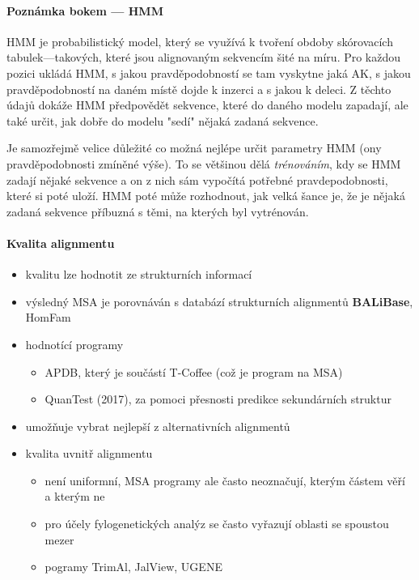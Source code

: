 \documentclass[DIV=8]{scrreprt}
\newcommand{\mybox}[2]{
    \paragraph{#1} #2
}
\begin{document}
\mybox{Poznámka bokem --- HMM}{HMM je probabilistický model, který se využívá k tvoření obdoby skórovacích tabulek---takových, které jsou alignovaným sekvencím šité na míru. Pro každou pozici ukládá HMM, s jakou pravděpodobností se tam vyskytne jaká AK, s jakou pravděpodobností na daném místě dojde k inzerci a s jakou k deleci. Z těchto údajů dokáže HMM předpovědět sekvence, které do daného modelu zapadají, ale také určit, jak dobře do modelu "sedí" nějaká zadaná sekvence.

Je samozřejmě velice důležité co možná nejlépe určit parametry HMM (ony pravděpodobnosti zmíněné výše). To se většinou dělá \emph{trénováním}, kdy se HMM zadají nějaké sekvence a on z nich sám vypočítá potřebné pravdepodobnosti, které si poté uloží. HMM poté může rozhodnout, jak velká šance je, že je nějaká zadaná sekvence příbuzná s těmi, na kterých byl vytrénován.}


\paragraph{Kvalita alignmentu}
\begin{itemize}[nosep]
    \item kvalitu lze hodnotit ze strukturních informací
    \item výsledný MSA je porovnáván s databází strukturních alignmentů \textbf{BALiBase}, HomFam
    \item hodnotící programy
\begin{itemize}[nosep]
    \item APDB, který je součástí T-Coffee (což je program na MSA)
    \item QuanTest (2017), za pomoci přesnosti predikce sekundárních struktur
\end{itemize}

    \item umožňuje vybrat nejlepší z alternativních alignmentů
    \item kvalita uvnitř alignmentu
\begin{itemize}[nosep]
    \item není uniformní, MSA programy ale často neoznačují, kterým částem věří a kterým ne
    \item pro účely fylogenetických analýz se často vyřazují oblasti se spoustou mezer
    \item pogramy TrimAl, JalView, UGENE
\end{itemize}

\end{itemize}
\end{document}
